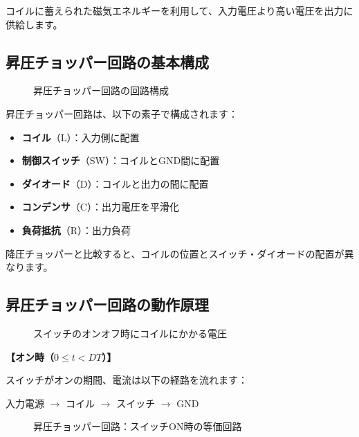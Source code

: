 コイルに蓄えられた磁気エネルギーを利用して、入力電圧より高い電圧を出力に供給します。

\subsection{昇圧チョッパー回路の基本構成}

\begin{figure}[H]
\centering
{}
\caption{昇圧チョッパー回路の回路構成}
\label{fig:ch05_boost_circuit}
\end{figure}

昇圧チョッパー回路は、以下の素子で構成されます：

\begin{itemize}
\item \textbf{コイル}（L）：入力側に配置
\item \textbf{制御スイッチ}（SW）：コイルとGND間に配置
\item \textbf{ダイオード}（D）：コイルと出力の間に配置
\item \textbf{コンデンサ}（C）：出力電圧を平滑化
\item \textbf{負荷抵抗}（R）：出力負荷
\end{itemize}

降圧チョッパーと比較すると、コイルの位置とスイッチ・ダイオードの配置が異なります。

\subsection{昇圧チョッパー回路の動作原理}

\begin{figure}[H]
\centering
{}
\caption{スイッチのオンオフ時にコイルにかかる電圧}
\label{fig:ch05_boost_voltage}
\end{figure}

\textbf{【オン時（$0 \le t < DT$）】}

スイッチがオンの期間、電流は以下の経路を流れます：

\begin{center}
入力電源 $\rightarrow$ コイル $\rightarrow$ スイッチ $\rightarrow$ GND
\end{center}

\begin{figure}[H]
\centering
{}
\caption{昇圧チョッパー回路：スイッチON時の等価回路}
\label{fig:ch05_boost_on}
\end{figure}

